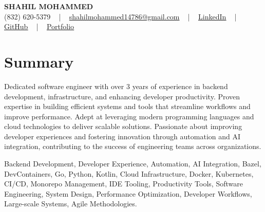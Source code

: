 \documentclass[letterpaper,10pt]{article}
\begin{document}
\begin{center}
    {\fontsize{14pt}{12pt}\selectfont \textbf{\MakeUppercase{Shahil Mohammed}}}\\ \vspace{2pt}
    \fontsize{10pt}{12pt}\selectfont (832) 620-5379 ~ | ~ \href{mailto:shahilmohammed14786@gmail.com}{shahilmohammed14786@gmail.com} ~ | ~  
    \href{https://www.linkedin.com/in/shahil-mohammed-9652931a1/}{\color{blue}\underline{LinkedIn}}  ~ | ~ 
    \href{https://github.com/freakbeast14}{\color{blue}\underline{GitHub}} ~ | ~ 
    \href{https://shahil-mohammed.netlify.app/}{\color{blue}\underline{Portfolio}}
    \vspace{-8pt}
\end{center}

\section{Summary}
\vspace{-2pt}\fontsize{8pt}{9pt}\selectfont
Dedicated software engineer with over 3 years of experience in backend development, infrastructure, and enhancing developer productivity. Proven expertise in building efficient systems and tools that streamline workflows and improve performance. Adept at leveraging modern programming languages and cloud technologies to deliver scalable solutions. Passionate about improving developer experiences and fostering innovation through automation and AI integration, contributing to the success of engineering teams across organizations.
 \vspace{-5pt}
 
{\fontsize{1pt}{1pt}\selectfont\color{white}
Backend Development, Developer Experience, Automation, AI Integration, Bazel, DevContainers, Go, Python, Kotlin, Cloud Infrastructure, Docker, Kubernetes, CI/CD, Monorepo Management, IDE Tooling, Productivity Tools, Software Engineering, System Design, Performance Optimization, Developer Workflows, Large-scale Systems, Agile Methodologies.
}
\vspace{-8pt}

\vspace{-2pt}
\end{document}
